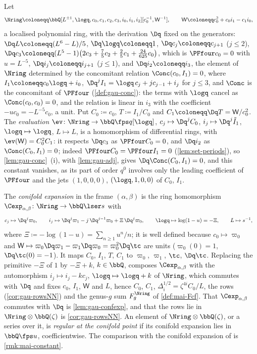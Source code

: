 \begin{defn}
\label{def:set-confexp}
Let
\[
\Nring\coloneqq\bbQ[L^{\pm1},\logq,c_0,c_1,c_2,c_3,i_0,i_1,i_2][c_0^{-1},\mathsf W^{-1}],\qquad\mathsf W\coloneqq c_0^2+c_0i_1-c_1i_0,
\]
a localised polynomial ring, with the derivation $\Dq$ fixed on the generators: $\Dq L\coloneqq(L^6-L)/5$, $\Dq\logq\coloneqq1$, $\Dq c_j\coloneqq c_{j+1}$ ($j\leq2$), $\Dq c_3\coloneqq(L^5-1)\bigl(2c_3+\frac75c_2+\frac25c_1+\frac{24}{625}c_0\bigr)$, which is $\PFfour c_0=0$ with $u=L^{-5}$, $\Dq i_j\coloneqq i_{j+1}$ ($j\leq1$), and $\Dq i_2\coloneqq i_3$, the element of $\Nring$ determined by the concomitant relation $\Conc(c_0,I_1)=0$, where $I_1\coloneqq c_0\logq+i_0$, $\Dq^jI_1=\logq\,c_j+jc_{j-1}+i_j$ for $j\leq3$, and $\Conc$ is the concomitant of $\PFfour$ (\cref{def:gau-conc}): the terms with $\logq$ cancel as $\Conc(c_0,c_0)=0$, and the relation is linear in $i_3$ with the coefficient $-uc_0=-L^{-5}c_0$, a unit. Put $C_0\coloneqq c_0$, $T\coloneqq I_1/C_0$ and $C_1\coloneqq\Dq T=\mathsf W/c_0^2$. The \emph{evaluation} $\ev\colon\Nring\to\bbQ\fps q[\logq]$, $c_j\mapsto\Dq^jC_0$, $i_j\mapsto\Dq^j\tilde I_1$, $\logq\mapsto\logq$, $L\mapsto L$, is a homomorphism of differential rings, with $\ev(\mathsf W)=C_0^2C_1$: it respects $\Dq c_3$ as $\PFfour C_0=0$, and $\Dq i_2$ as $\Conc(C_0,I_1)=0$; indeed $\PFfour C_0=\PFfour I_1=0$ (\cref{lem:set-periods}), so \cref{lem:gau-conc}~(i), with \cref{lem:gau-adj}, gives $\Dq\Conc(C_0,I_1)=0$, and this constant vanishes, as its part of order $q^0$ involves only the leading coefficient of $\PFfour$ and the jets $(1,0,0,0)$, $(\logq,1,0,0)$ of $C_0$, $I_1$.

The \emph{conifold expansion} in the frame $(\alpha,\beta)$ is the ring homomorphism $\Cexp_{\alpha,\beta}\colon\Nring\to\bbQ\lser s$ with
\[
c_j\mapsto\Dq^j\varpi_0,\qquad i_j\mapsto\Dq^j\varpi_1-j\,\Dq^{j-1}\varpi_0+\Xi\,\Dq^j\varpi_0,\qquad\logq\mapsto\log(1-u)=-\Xi,\qquad L\mapsto s^{-1},
\]
where $\Xi\coloneqq-\log(1-u)=\sum_{n\geq1}u^n/n$; it is well defined because $c_0\mapsto\varpi_0$ and $\mathsf W\mapsto\varpi_0\Dq\varpi_1-\varpi_1\Dq\varpi_0=\varpi_0^2\Dq\tc$ are units ($\varpi_0(0)=1$, $\Dq\tc(0)=-1$). It maps $C_0$, $I_1$, $T$, $C_1$ to $\varpi_0$, $\varpi_1$, $\tc$, $\Dq\tc$. Replacing the primitive $-\Xi$ of $1$ by $-\Xi+k$, $k\in\bbQ$, composes $\Cexp_{\alpha,\beta}$ with the automorphism $i_j\mapsto i_j-kc_j$, $\logq\mapsto\logq+k$ of $\Nring$, which commutes with $\Dq$ and fixes $c_0$, $I_1$, $\mathsf W$ and $L$, hence $C_0$, $C_1$, $\Delta_i^{1/2}=\zeta^{4i}C_0/L$, the rows (\cref{cor:gau-rowsNN}) and the genus-$g$ sum $F_g^{\Nring}$ of \cref{def:mai-Fcf}. That $\Cexp_{\alpha,\beta}$ commutes with $\Dq$ is \cref{lem:gau-confexp}, and that the rows lie in $\Nring\otimes\bbQ(\zeta)$ is \cref{cor:gau-rowsNN}. An element of $\Nring\otimes\bbQ(\zeta)$, or a series over it, is \emph{regular at the conifold point} if its conifold expansion lies in $\bbQ\fps u$, coefficientwise. The comparison with the conifold expansion of \cite{CGYZ26} is \cref{rmk:mai-constant}.
\end{defn}

